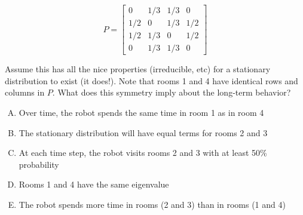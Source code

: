 \documentclass[12pt]{amsart}
\begin{document}
$$P = \begin{bmatrix} 0 & 1/3 & 1/3 & 0 \\ 1/2 & 0 & 1/3 & 1/2 \\ 1/2 & 1/3 & 0 & 1/2 \\ 0 & 1/3 & 1/3 & 0 \end{bmatrix}$$

Assume this has all the nice properties (irreducible, etc) for a stationary distribution to exist (it does!). Note that rooms 1 and 4 have identical rows and columns in $P$. What does this symmetry imply about the long-term behavior?

\begin{enumerate}[(A)]
\item Over time, the robot spends the same time in room 1 as in room 4 
\item The stationary distribution will have equal terms for rooms 2 and 3
\item At each time step, the robot visits rooms 2 and 3 with at least 50\% probability 
\item Rooms 1 and 4 have the same eigenvalue 
\item The robot spends more time in rooms (2 and 3) than in rooms (1 and 4)
\end{enumerate}

\end{document}
